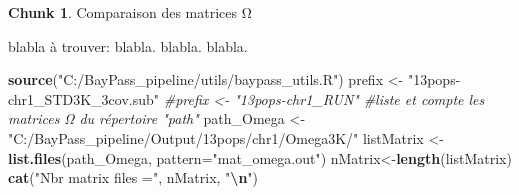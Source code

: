 \documentclass[
  openany]{book}
\newenvironment{Shaded}{\begin{snugshade}}{\end{snugshade}}
\newcommand{\AttributeTok}[1]{\textcolor[rgb]{0.13,0.29,0.53}{#1}}
\newcommand{\CommentTok}[1]{\textcolor[rgb]{0.56,0.35,0.01}{\textit{#1}}}
\newcommand{\FunctionTok}[1]{\textcolor[rgb]{0.13,0.29,0.53}{\textbf{#1}}}
\newcommand{\NormalTok}[1]{#1}
\newcommand{\OtherTok}[1]{\textcolor[rgb]{0.56,0.35,0.01}{#1}}
\newcommand{\SpecialCharTok}[1]{\textcolor[rgb]{0.81,0.36,0.00}{\textbf{#1}}}
\newcommand{\StringTok}[1]{\textcolor[rgb]{0.31,0.60,0.02}{#1}}
\theoremstyle{definition}
\theoremstyle{definition}
\theoremstyle{definition}
\newtheorem{exercise}{Chunk}[chapter]
\theoremstyle{definition}
\theoremstyle{remark}
\begin{document}
\begin{exercise}
\protect\hypertarget{exr:chunk4}{}\label{exr:chunk4}{Comparaison des matrices Ω}
\end{exercise}

blabla à trouver:
blabla.
blabla.
blabla.

\begin{Shaded}
\begin{Highlighting}[]
\FunctionTok{source}\NormalTok{(}\StringTok{"C:/BayPass\_pipeline/utils/baypass\_utils.R"}\NormalTok{)}
\NormalTok{prefix }\OtherTok{\textless{}{-}} \StringTok{"13pops{-}chr1\_STD3K\_3cov.sub"}
\CommentTok{\#prefix \textless{}{-} "13pops{-}chr1\_RUN"}
\CommentTok{\#liste et compte les matrices Ω du répertoire "path"}
\NormalTok{path\_Omega }\OtherTok{\textless{}{-}} \StringTok{"C:/BayPass\_pipeline/Output/13pops/chr1/Omega3K/"}
\NormalTok{listMatrix }\OtherTok{\textless{}{-}} \FunctionTok{list.files}\NormalTok{(path\_Omega, }\AttributeTok{pattern=}\StringTok{"mat\_omega.out"}\NormalTok{)}
\NormalTok{nMatrix}\OtherTok{\textless{}{-}}\FunctionTok{length}\NormalTok{(listMatrix)}
\FunctionTok{cat}\NormalTok{(}\StringTok{"Nbr matrix files ="}\NormalTok{, nMatrix, }\StringTok{"}\SpecialCharTok{\textbackslash{}n}\StringTok{"}\NormalTok{)}


\end{Highlighting}
\end{Shaded}
\end{document}
